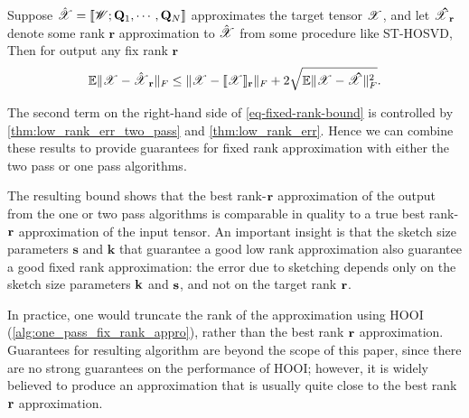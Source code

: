 \begin{thm}
\label{thm:fix_rank_err}
Suppose $\hat{\T{X}} = \llbracket \T{W}; \mathbf{Q}_1,\cdots, \mathbf{Q}_N \rrbracket$
approximates the target tensor $\T{X}$, %
and let $\T{\hat{X}}_\V{r}$ denote some rank $\mathbf{r}$ approximation to $\hat{\T{X}}$ from some procedure like ST-HOSVD,
Then for output  any fix rank $\mathbf{r}$
\begin{equation*} \label{eq-fixed-rank-bound}
\mathbb{E} \|\T{X} - \hat{\T{X}}_{\V{r}} \|_F \le
\|\T{X} - \llbracket \T{X}\rrbracket_\mathbf{r}\|_F
+2\sqrt{\mathbb{E}\|\T{X}-\T{\hat{X}}\|_F^2}.
\end{equation*}
\end{thm}

The second term on the right-hand side of \ref{eq-fixed-rank-bound}
is controlled by \ref{thm:low_rank_err_two_pass} and \ref{thm:low_rank_err}.
Hence we can combine these results
to provide guarantees for fixed rank approximation with either the
two pass or one pass algorithms.


The resulting bound shows that the best rank-$\mathbf{r}$
approximation of the output from the one or two pass algorithms
is comparable in quality to a true best rank-$\mathbf{r}$ approximation of the input tensor.
An important insight %
is that the sketch size parameters $\mathbf{s}$ and $\mathbf{k}$
that guarantee a good low rank approximation
also guarantee a good fixed rank approximation:
the error due to sketching depends only
on the sketch size parameters $\mathbf{k}$ and $\mathbf{s}$,
and not on the target rank $\mathbf{r}$.


In practice, one would truncate the rank of the approximation using
HOOI (\ref{alg:one_pass_fix_rank_appro}),
rather than the best rank $\mathbf{r}$ approximation.
Guarantees for resulting algorithm are beyond the scope of this paper,
since there are no strong guarantees on the performance of HOOI;
however, it is widely believed to produce an approximation that is usually
quite close to the best rank $\mathbf{r}$ approximation.

